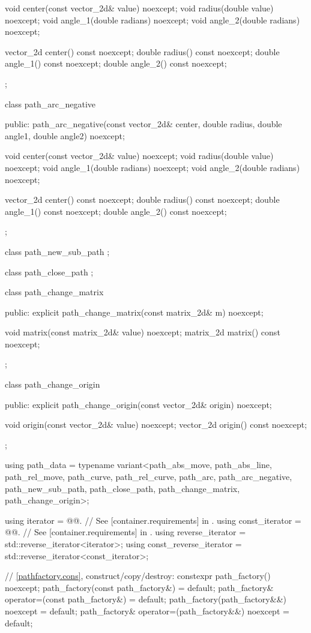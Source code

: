 \begin{codeblock}
{{{{{{      void center(const vector_2d& value) noexcept;
      void radius(double value) noexcept;
      void angle_1(double radians) noexcept;
      void angle_2(double radians) noexcept;
      
      vector_2d center() const noexcept;
      double radius() const noexcept;
      double angle_1() const noexcept;
      double angle_2() const noexcept;
    };
    
    class path_arc_negative {
    public:
      path_arc_negative(const vector_2d& center, double radius, double angle1, double angle2) noexcept;
      
      void center(const vector_2d& value) noexcept;
      void radius(double value) noexcept;
      void angle_1(double radians) noexcept;
      void angle_2(double radians) noexcept;
      
      vector_2d center() const noexcept;
      double radius() const noexcept;
      double angle_1() const noexcept;
      double angle_2() const noexcept;
    };
    
    class path_new_sub_path {
    };
    
    class path_close_path {
    };
    
    class path_change_matrix {
    public:
      explicit path_change_matrix(const matrix_2d& m) noexcept;
      
      void matrix(const matrix_2d& value) noexcept;
      matrix_2d matrix() const noexcept;
    };
    
    class path_change_origin {
    public:
      explicit path_change_origin(const vector_2d& origin) noexcept;
      
      void origin(const vector_2d& value) noexcept;
      vector_2d origin() const noexcept;
    };
    
    using path_data      = typename variant<path_abs_move, path_abs_line, path_rel_move,
      path_curve, path_rel_curve, path_arc, path_arc_negative, path_new_sub_path,
      path_close_path, path_change_matrix, path_change_origin>;
    
    using iterator       = @@. // See [container.requirements] in \cppseventeen.
    using const_iterator = @@. // See [container.requirements] in \cppseventeen.
    using reverse_iterator       = std::reverse_iterator<iterator>;
    using const_reverse_iterator = std::reverse_iterator<const_iterator>;
    
    // \ref{pathfactory.cons}, construct/copy/destroy:
    constexpr path_factory() noexcept;
    path_factory(const path_factory&) = default;
    path_factory& operator=(const path_factory&) = default;
    path_factory(path_factory&&) noexcept = default;
    path_factory& operator=(path_factory&&) noexcept = default;
    
}}}}}
\end{codeblock}
